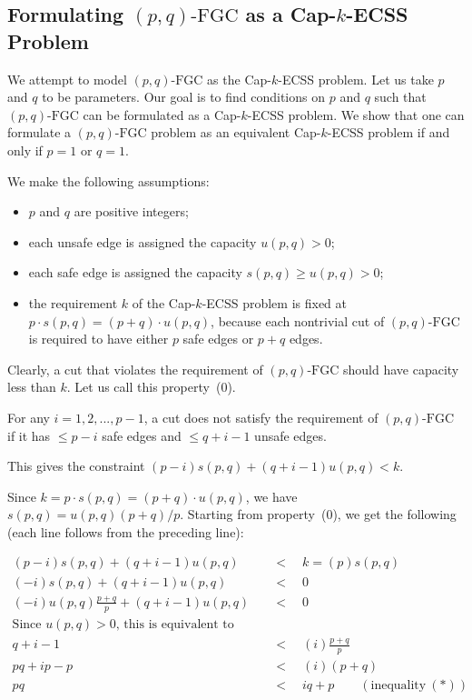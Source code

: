 \documentclass[11pt]{article}
\newcommand{\fgc}{\mathrm{FGC}}
\newcommand{\pqfgc}{(p,q)\text{-}\fgc}
\begin{document}
\clearpage

\begin{appendices}
\section{Formulating $\pqfgc$ as a Cap-$k$-ECSS Problem \label{sec:A1:pqfgc}}
{
We attempt to model $\pqfgc$ as the Cap-$k$-ECSS problem.
Let us take $p$ and $q$ to be parameters.
Our goal is to find conditions on $p$ and $q$ such that $\pqfgc$
can be formulated as a Cap-$k$-ECSS problem.
We show that one can formulate a $\pqfgc$ problem as an equivalent
Cap-$k$-ECSS problem if and only if $p=1$ or $q=1$.

We make the following assumptions:

\begin{itemize}
\item
$p$ and $q$ are positive integers;
\item
each unsafe edge is assigned the capacity $u(p,q)>0$;
\item
each safe edge is assigned the capacity $s(p,q)\geq u(p,q)>0$;
\item
the requirement $k$ of the Cap-$k$-ECSS problem is fixed at
$p \cdot s(p,q) = (p+q) \cdot u(p,q)$, because each nontrivial cut
of $\pqfgc$ is required to have either $p$ safe edges or $p+q$ edges.
\end{itemize}

Clearly, a cut that violates the requirement of $\pqfgc$ should
have capacity less than $k$.
Let us call this property~(0).

For any $i = 1,2,...,p-1$, a cut does not satisfy the requirement
of $\pqfgc$ if it has $\leq p-i$ safe edges and $\leq q+i-1$ unsafe edges.

This gives the constraint $(p-i)s(p,q) + (q+i-1)u(p,q) < k$.

Since $k = p\cdot s(p,q) = (p+q)\cdot u(p,q)$, we have  $s(p,q) =
u(p,q)(p+q)/p$. Starting from property~(0), we get the following
(each line follows from the preceding line):

\begin{align*}
(p-i) s(p,q) + (q+i-1) u(p,q) &\quad <\quad k = (p) s(p,q) \\
(-i) s(p,q) + (q+i-1) u(p,q) &\quad <\quad 0 \\
(-i)  u(p,q) \frac{p+q}{p} + (q+i-1) u(p,q) &\quad <\quad 0 \\
\text{Since $u(p,q)>0$, this is equivalent to} & \\
q+i-1 &\quad <\quad (i)  \frac{p+q}{p} \\
pq+ip-p &\quad <\quad (i) (p+q) \\
pq &\quad <\quad iq + p \qquad (\text{inequality}~(*)) \\
\end{align*}


}
\end{appendices}
\end{document}
